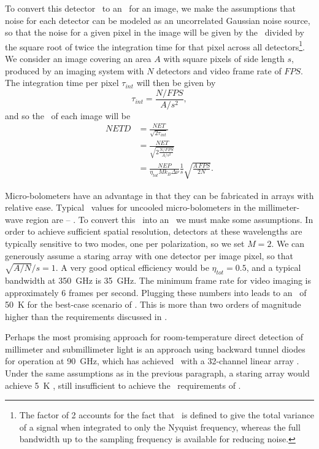 To convert this detector \NET\ to an \NETD\ for an image, we make the assumptions that noise for each detector can be modeled as an uncorrelated Gaussian noise source, so that the noise for a given pixel in the image will be given by the \NET\ divided by the square root of twice the integration time for that pixel across all detectors\footnote{%
  The factor of 2 accounts for the fact that \NEP\ is defined to give the total variance of a signal when integrated to only the Nyquist frequency, whereas the full bandwidth up to the sampling frequency is available for reducing noise.
}. 
We consider an image covering an area $A$ with square pixels of side length $s$, produced by an imaging system with $N$ detectors and video frame rate of $FPS$.
The integration time per pixel $\tau_{int}$ will then be given by
\begin{equation}
  \tau_{int} = \frac{N / FPS}{A / s^2},
\end{equation}
and so the \NETD\ of each image will be
\begin{align}
  NETD & = \frac{NET}{\sqrt{2\tau_{int}}} \\
       & = \frac{NET}{\sqrt{ 2 \frac{N / FPS}{A / s^2}}} \\
       & = \frac{NEP}{\eta_{tot} M k_B \Delta \nu} \frac{1}{s} \sqrt{\frac{A\,FPS}{2 N}} .
       \label{eqn:ch1-netd-defn}
\end{align}

Micro-bolometers have an advantage in that they can be fabricated in arrays with relative ease.
Typical \NEP\ values for uncooled micro-bolometers in the millimeter-wave region are -- \cite{nemarich_microbolometer_2005,rogalski_terahertz_2011}.
To convert this \NEP\ into an \NETD\ we must make some assumptions.
In order to achieve sufficient spatial resolution, detectors at these wavelengths are typically sensitive to two modes, one per polarization, so we set $M = 2$.
We can generously assume a staring array with one detector per image pixel, so that $\sqrt{A/N}/s = 1$.
A very good optical efficiency would be $\eta_{tot} = 0.5$, and a typical bandwidth at \SI{350}{\GHz} is \SI{35}{\GHz}.
The minimum frame rate for video imaging is approximately 6 frames per second.
Plugging these numbers into  leads to an \NETD\ of \SI{50}{\K} for the best-case scenario of  \NEP.
This is more than two orders of magnitude higher than the requirements discussed in .

Perhaps the most promising approach for room-temperature direct detection of millimeter and submillimeter light is an approach using backward tunnel diodes for operation at \SI{90}{\GHz}, which has achieved  \NEP\ with a 32-channel linear array \cite{schaffner_wideband_2008,wikner_demonstration_2009}.
Under the same assumptions as in the previous paragraph, a staring array would achieve \SI{5}{\K} \NETD, still insufficient to achieve the \NETD\ requirements of .

